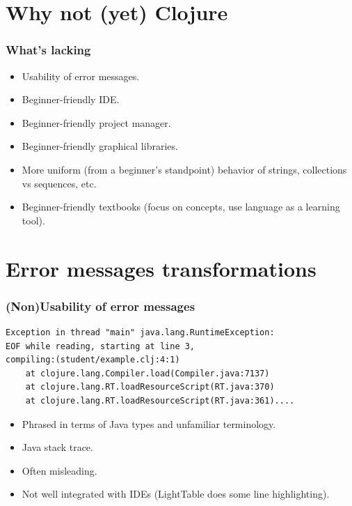 \documentclass{beamer}
\begin{document}
\section{Why {\bf not} (yet) Clojure}

\begin{frame}
   \frametitle{What's lacking}
\begin{itemize}
\item Usability of error messages. %
\item Beginner-friendly IDE. 
\item Beginner-friendly project manager. 
\item Beginner-friendly graphical libraries. 
\item More uniform (from a beginner's standpoint) behavior of strings, collections vs sequences, etc.  
\item Beginner-friendly textbooks (focus on concepts, use language as a learning tool). 
\end{itemize}
\end{frame}

\section{Error messages transformations}
\begin{frame}[fragile]
   \frametitle{(Non)Usability of error messages}
\begin{verbatim}
Exception in thread "main" java.lang.RuntimeException:
EOF while reading, starting at line 3,
compiling:(student/example.clj:4:1)
	at clojure.lang.Compiler.load(Compiler.java:7137)
	at clojure.lang.RT.loadResourceScript(RT.java:370)
	at clojure.lang.RT.loadResourceScript(RT.java:361)....
\end{verbatim}
\begin{itemize}
\item Phrased in terms of Java types and unfamiliar terminology.
\item Java stack trace. 
\item Often misleading. 
\item Not well integrated with IDEs (LightTable does some line highlighting). 
\end{itemize}
\end{frame}
\end{document}
